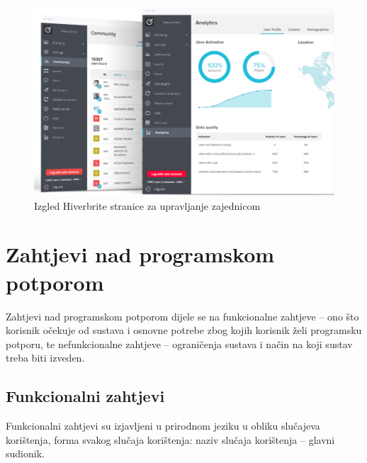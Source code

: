 \documentclass[zavrsni, numeric]{fer}
\begin{document}
\begin{figure}[H]
	\centering
	\includegraphics[width=13cm]{slike/hiverbrite-upravljanje.png}
	\caption{Izgled Hiverbrite stranice za upravljanje zajednicom}
	\label{fig:hiverbrite-menagements}
\end{figure}

\chapter{Zahtjevi nad programskom potporom}
Zahtjevi nad programskom potporom dijele se na funkcionalne zahtjeve – ono što korisnik očekuje od sustava i osnovne potrebe zbog kojih korisnik želi programsku potporu, te nefunkcionalne zahtjeve – ograničenja sustava i način na koji sustav treba biti izveden.

\section{Funkcionalni zahtjevi}
Funkcionalni zahtjevi su izjavljeni u prirodnom jeziku u obliku slučajeva korištenja, forma svakog slučaja korištenja: naziv slučaja korištenja – glavni sudionik.
\end{document}
